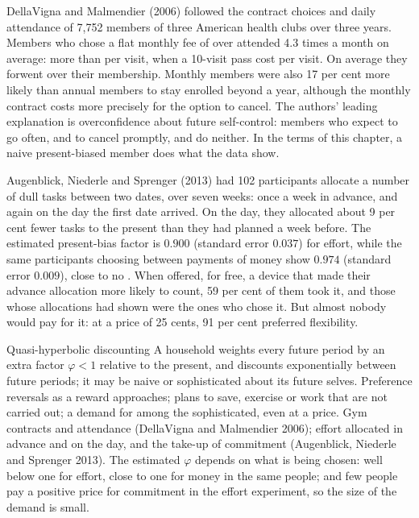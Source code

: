 \begin{record}
DellaVigna and Malmendier (2006) followed the contract choices and daily attendance of 7,752 members of
three American health clubs over three years. Members who chose a flat monthly fee of over 
attended 4.3 times a month on average: more than  per visit, when a 10-visit pass cost
 per visit. On average they forwent  over their membership. Monthly members were also
17 per cent more likely than annual members to stay enrolled beyond a year, although the monthly
contract costs more precisely for the option to cancel. The authors' leading explanation is
overconfidence about future self-control: members who expect to go often, and to cancel promptly,
and do neither. In the terms of this chapter, a naive present-biased member does what the data show.
\end{record}

\begin{record}
Augenblick, Niederle and Sprenger (2013) had 102 participants allocate a number of dull tasks between two
dates, over seven weeks: once a week in advance, and again on the day the first date arrived. On the
day, they allocated about 9 per cent fewer tasks to the present than they had planned a week before.
The estimated present-bias factor is $0.900$ (standard error $0.037$) for effort, while the same
participants choosing between payments of money show $0.974$ (standard error $0.009$), close to no . When offered, for free, a device that made their advance allocation more likely to count, 59 per
cent of them took it, and those whose allocations had shown  were the ones who chose it.
But almost nobody would pay for it: at a price of 25 cents, 91 per cent preferred flexibility.
\end{record}

\begin{model}{Quasi-hyperbolic discounting}
\assumes A household weights every future period by an extra factor $\varphi < 1$ relative to the
present, and discounts exponentially between future periods; it may be naive or sophisticated about
its future selves.
\predicts Preference reversals as a reward approaches; plans to save, exercise or work that are not
carried out; a demand for  among the sophisticated, even at a price.
\tested Gym contracts and attendance (DellaVigna and Malmendier 2006); effort allocated in advance
and on the day, and the take-up of commitment (Augenblick, Niederle and Sprenger 2013).
\breaks The estimated $\varphi$ depends on what is being chosen: well below one for effort, close to
one for money in the same people; and few people pay a positive price for commitment in the
effort experiment, so the size of the demand is small.
\end{model}

